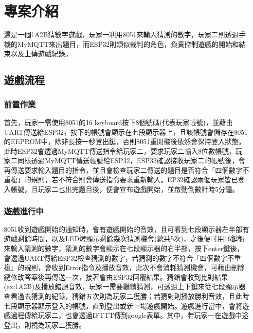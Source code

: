 \documentclass{scrartcl}
\title{\mytitle}
\author{\myname}
\subtitle{\mysubtitle}
\date{\mydate}
\begin{document}
\maketitle

\section{專案介紹}

\setlength{\parindent}{2em}
這是一個1A2B猜數字遊戲，玩家一利用8051來輸入猜測的數字，玩家二則透過手機的MyMQTT來出題目，而ESP32則類似裁判的角色，負責控制遊戲的開始和結束以及上傳遊戲紀錄。

\subsection{遊戲流程}

\subsubsection{前置作業}
{\indent}首先，玩家一需使用8051的16 keyboard按下8個號碼(代表玩家帳號)，並藉由UART傳送給ESP32，按下的帳號會顯示在七段顯示器上，且該帳號會儲存在8051的EEPROM中，除非長按一秒登出鍵，否則8051重開機後依然會保持登入狀態。此時ESP32會透過MyMQTT傳送指令給玩家二，要求玩家二輸入8位數帳號，玩家二同樣透過MyMQTT傳送帳號給ESP32，ESP32確認接收玩家二的帳號後，會再傳送要求輸入題目的指令，並且會檢查玩家二傳送的題目是否符合「四個數字不重複」的規則，若不符合則會傳送指令要求重新輸入。EP32確認兩個玩家皆已登入帳號，且玩家二也出完題目後，便會宣布遊戲開始，並啟動倒數計時5分鐘。

\subsubsection{遊戲進行中}
{\indent}8051收到遊戲開始的通知時，會有遊戲開始的音效，且可看到七段顯示器左半部有遊戲剩餘時間，以及LED燈顯示剩餘幾次猜測機會(總共5次)，之後便可用16鍵盤來輸入猜測的數字，猜測的數字會顯示在七段顯示器的右半部，按下enter鍵後，會透過UART傳給ESP32檢查猜測的數字，若猜測的數字不符合「四個數字不重複」的規則，會收到Error指令及播放音效，此次不會消耗猜測機會，可藉由刪除鍵修改答案後再傳送一次，接著會由ESP32回覆結果。猜錯會收到比對結果(ex:1A2B)及播放錯誤音效，玩家一需要繼續猜測，可透過上下鍵來從七段顯示器查看過去猜測的紀錄，猜錯五次則為玩家二獲勝；若猜對則播放勝利音效，且此時七段顯示器顯示登入的帳號，直到登出或新一場遊戲開始。遊戲進行當中，會將遊戲過程傳給玩家二，也會透過IFTTT傳到google表單。其中，若玩家一在遊戲中途登出，則視為玩家二獲勝。
\end{document}
